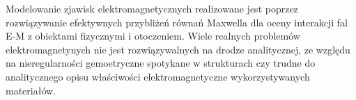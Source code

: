 Modelowanie zjawisk elektromagnetycznych realizowane jest poprzez rozwiązywanie efektywnych przybliżeń równań Maxwella dla oceny interakcji fal E-M z obiektami fizycznymi i otoczeniem. Wiele realnych problemów elektromagnetynych nie jest rozwiązywalnych na drodze analitycznej, ze względu na nieregularności gemoetryczne spotykane w strukturach czy trudne do analitycznego opisu właściwości elektromagnetyczne wykorzystywanych materiałów.


